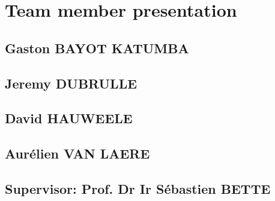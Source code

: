 \documentclass[a4paper,10pt]{article}
\begin{document}
\section{Team member presentation}

\subsection{Gaston BAYOT KATUMBA}


\subsection{Jeremy DUBRULLE}


\subsection{David HAUWEELE}


\subsection{Aurélien VAN LAERE}


\subsection{Supervisor: Prof. Dr Ir Sébastien BETTE}

 
\end{document}
